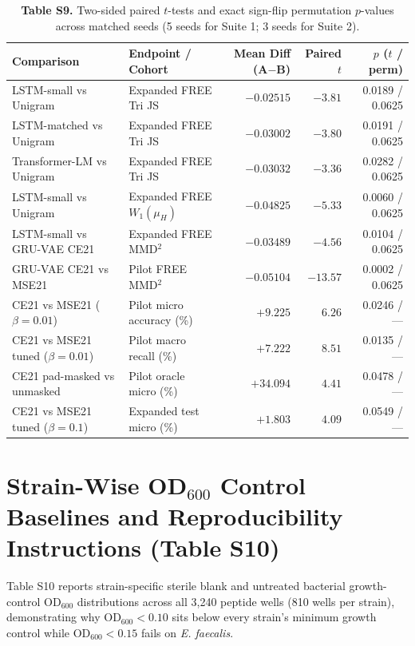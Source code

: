 \documentclass[11pt,a4paper]{article}
\newcommand{\rev}[1]{#1}
\begin{document}
\begin{table}[H]
\centering\footnotesize
\caption*{\rev{\textbf{Table S9.} Two-sided paired $t$-tests and exact sign-flip permutation $p$-values across matched seeds (5 seeds for Suite 1; 3 seeds for Suite 2).}}
\begin{tabular}{llrrr}
\toprule
Comparison & Endpoint / Cohort & Mean Diff (A$-$B) & Paired $t$ & $p$ ($t$ / perm) \\
\midrule
LSTM-small vs Unigram & Expanded FREE Tri JS & $-0.02515$ & $-3.81$ & 0.0189 / 0.0625 \\
LSTM-matched vs Unigram & Expanded FREE Tri JS & $-0.03002$ & $-3.80$ & 0.0191 / 0.0625 \\
Transformer-LM vs Unigram & Expanded FREE Tri JS & $-0.03032$ & $-3.36$ & 0.0282 / 0.0625 \\
LSTM-small vs Unigram & Expanded FREE $W_1(\mu_H)$ & $-0.04825$ & $-5.33$ & 0.0060 / 0.0625 \\
LSTM-small vs GRU-VAE CE21 & Expanded FREE MMD$^2$ & $-0.03489$ & $-4.56$ & 0.0104 / 0.0625 \\
GRU-VAE CE21 vs MSE21 & Pilot FREE MMD$^2$ & $-0.05104$ & $-13.57$ & 0.0002 / 0.0625 \\
CE21 vs MSE21 ($\beta=0.01$) & Pilot micro accuracy (\%) & $+9.225$ & $6.26$ & 0.0246 / --- \\
CE21 vs MSE21 tuned ($\beta=0.01$) & Pilot macro recall (\%) & $+7.222$ & $8.51$ & 0.0135 / --- \\
CE21 pad-masked vs unmasked & Pilot oracle micro (\%) & $+34.094$ & $4.41$ & 0.0478 / --- \\
CE21 vs MSE21 tuned ($\beta=0.1$) & Expanded test micro (\%) & $+1.803$ & $4.09$ & 0.0549 / --- \\
\bottomrule
\end{tabular}
\end{table}

\FloatBarrier
\section{\rev{Strain-Wise OD$_{600}$ Control Baselines and Reproducibility Instructions (Table S10)}}
\rev{Table S10 reports strain-specific sterile blank and untreated bacterial growth-control OD$_{600}$ distributions across all 3,240 peptide wells (810 wells per strain), demonstrating why OD$_{600}<0.10$ sits below every strain's minimum growth control while OD$_{600}<0.15$ fails on \textit{E. faecalis}.}
\end{document}
